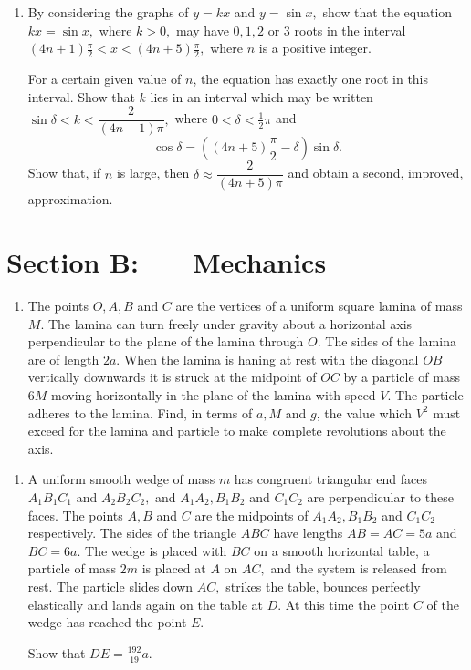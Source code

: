 \documentclass[a4, 11pt]{report}
\newlength{\qspace}
\newcounter{qnumber}
\newenvironment{question}%
 {\vspace{\qspace}
  \begin{enumerate}[\bfseries 1\quad][10]%
    \setcounter{enumi}{\value{qnumber}}%
    \item%
 }
{
  \end{enumerate}
  \filbreak
  \stepcounter{qnumber}
 }
\begin{document}
	
\begin{question}
By considering the graphs of $y=kx$ and $y=\sin x,$ show that the
equation $kx=\sin x,$ where $k>0,$ may have $0,1,2$ or $3$ roots
in the interval $(4n+1)\frac{\pi}{2}<x<(4n+5)\frac{\pi}{2},$
where $n$ is a positive integer. 


For a certain given value of $n$, the equation has exactly one root
in this interval. Show that $k$ lies in an interval which may be
written $\sin\delta<k<\dfrac{2}{(4n+1)\pi},$ where $0<\delta<\frac{1}{2}\pi$
and 
\[
\cos\delta=\left((4n+5)\frac{\pi}{2}-\delta\right)\sin\delta.
\]
Show that, if $n$ is large, then $\delta\approx\dfrac{2}{(4n+5)\pi}$
and obtain a second, improved, approximation. 
\end{question}
			
		
		
		
	
\newpage
\section*{Section B: \ \ \ Mechanics}


	
\begin{question}
The points $O,A,B$ and $C$ are the vertices of a uniform square
lamina of mass $M.$ The lamina can turn freely under gravity about
a horizontal axis perpendicular to the plane of the lamina through
$O$. The sides of the lamina are of length $2a.$ When the lamina
is haning at rest with the diagonal $OB$ vertically downwards it
is struck at the midpoint of $OC$ by a particle of mass $6M$ moving
horizontally in the plane of the lamina with speed $V$. The particle
adheres to the lamina. Find, in terms of $a,M$ and $g$, the value
which $V^{2}$ must exceed for the lamina and particle to make complete
revolutions about the axis.  
	\end{question}
	
\begin{question}	
A uniform smooth wedge of mass $m$ has congruent triangular end faces
$A_{1}B_{1}C_{1}$ and $A_{2}B_{2}C_{2},$ and $A_{1}A_{2},B_{1}B_{2}$
and $C_{1}C_{2}$ are perpendicular to these faces. The points $A,B$
and $C$ are the midpoints of $A_{1}A_{2},B_{1}B_{2}$ and $C_{1}C_{2}$
respectively. The sides of the triangle $ABC$ have lengths $AB=AC=5a$
and $BC=6a.$ The wedge is placed with $BC$ on a smooth horizontal
table, a particle of mass $2m$ is placed at $A$ on $AC,$ and the
system is released from rest. The particle slides down $AC,$ strikes
the table, bounces perfectly elastically and lands again on the table
at $D$. At this time the point $C$ of the wedge has reached the
point $E$. 

Show that $DE=\frac{192}{19}a.$ 
\end{question}
\end{document}
